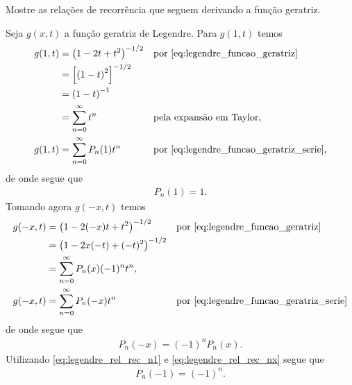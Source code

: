 \documentclass[a4paper,12pt, leqno, answers]{exam}
\begin{document}
\begin{questions}
    \question Mostre as rela\c{c}\~{o}es de recorr\^{e}ncia que seguem derivando a fun\c{c}\~{a}o geratriz.
    \begin{solution}
        Seja $g(x, t)$ a fun\c{c}\~{a}o geratriz de Legendre. Para $g(1, t)$ temos
        \begin{align*}
            g(1, t) &= \left( 1 - 2 t + t^2 \right)^{-1/2} && \text{por \eqref{eq:legendre_funcao_geratriz}} \\
            &= \left[ \left( 1 - t \right)^2 \right]^{-1/2} \\
            &= \left( 1 - t \right)^{-1} \\
            &= \sum_{n = 0}^\infty t^n && \text{pela expans\~{a}o em Taylor}, \\
            g(1, t) &= \sum_{n = 0}^\infty P_n(1) t^n && \text{por \eqref{eq:legendre_funcao_geratriz_serie},}
        \end{align*}
        de onde segue que
        \begin{align}
            P_n(1) = 1. \label{eq:legendre_rel_rec_n1}
        \end{align}
        Tomando agora $g(-x, t)$ temos
        \begin{align*}
            g(-x, t) &= \left( 1 - 2 (-x) t + t^2 \right)^{-1/2} && \text{por \eqref{eq:legendre_funcao_geratriz}} \\
            &= \left( 1 - 2 x (-t) + (-t)^2 \right)^{-1/2} \\
            &= \sum_{n = 0}^\infty P_n(x) (-1)^n t^n, \\
            g(-x, t) &= \sum_{n = 0}^\infty P_n(-x) t^n && \text{por \eqref{eq:legendre_funcao_geratriz_serie}}
        \end{align*}
        de onde segue que
        \begin{align}
            P_n(-x) = (-1)^n P_n(x). \label{eq:legendre_rel_rec_nx}
        \end{align}
        Utilizando \eqref{eq:legendre_rel_rec_n1} e \eqref{eq:legendre_rel_rec_nx} segue que
        \begin{align*}
            P_n(-1) = (-1)^n.
        \end{align*}


\end{solution}
\end{questions}
\end{document}
